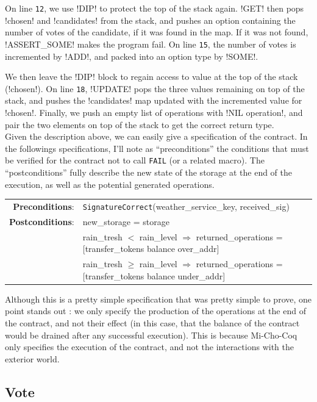 \documentclass{report}
\begin{document}
On line \texttt{12}, we use !DIP! to protect the top of the
stack again. !GET! then pops !chosen! and
!candidates! from  the stack, and pushes an
option containing the number of votes of the candidate, if it was
found in the map. If it was not found, !ASSERT_SOME! makes
the program fail. On line \texttt{15}, the number of votes is
incremented by !ADD!, and packed into an option type by
!SOME!.

We then leave the !DIP! block to regain access to
value at the top of the stack (!chosen!). On line
\texttt{18}, !UPDATE! pops the three values remaining
on top of the stack, and pushes the !candidates! map updated
with the incremented value for !chosen!. Finally, we push an
empty list of operations with !NIL operation!, and pair the
two elements on top of the stack to get the correct return type.\\

Given the description above, we can easily give a specification of the contract. In the followings specifications, I'll note as ``preconditions'' the conditions that must be verified for the contract not to call \lstinline{FAIL} (or a related macro). The ``postconditions'' fully describe the new state of the storage at the end of the execution, as well as the potential generated operations.

{\small
\begin{longtable}{rl}
  \textbf{Preconditions}: & \texttt{SignatureCorrect}(weather\_service\_key, received\_sig)\\
  \textbf{Postconditions}: & new\_storage = storage\\
  & rain\_tresh $<$ rain\_level $\Rightarrow$ returned\_operations = [transfer\_tokens balance over\_addr]\\
  & rain\_tresh $\ge$ rain\_level $\Rightarrow$ returned\_operations = [transfer\_tokens balance under\_addr]\\
\end{longtable}}

Although this is a pretty simple specification that was pretty simple to prove, one point stands out : we only specify the production of the operations at the end of the contract, and not their effect (in this case, that the balance of the contract would be drained after any successful execution). This is because Mi-Cho-Coq only specifies the execution of the contract, and not the interactions with the exterior world.

\subsection{Vote}
\end{document}
